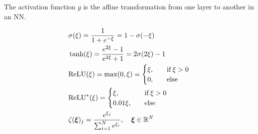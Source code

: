     




    
    The activation function $g$ is the affine transformation from one layer to another in an NN.   

    \begin{subequations}\label{eq:activation_functions}
        \begin{align}
            &\sigma(\xi) = \frac{1}{1+e^{-\xi}} = 1- \sigma(-\xi) \label{eq:sigmoid}\\
            &\tanh(\xi) = \frac{e^{2\xi}-1}{e^{2\xi}+1} = 2\sigma(2\xi) -1\label{eq:tanh} \\
            &\mathrm{ReLU}(\xi) = \max(0,\xi) = \begin{cases}
                \xi,\quad &\mathrm{if }\, \xi >0 \\
                0,\quad &\mathrm{else}
            \end{cases} \label{eq:relu}\\
            &\mathrm{ReLU}^*(\xi)  = \begin{cases}
                \xi,\quad &\mathrm{if }\, \xi >0 \\
                0.01\xi,\quad &\mathrm{else}
            \end{cases} \label{eq:leaky_relu} \\
            &\zeta(\svec{\xi})_j = \frac{e^{\xi_j}}{\sum\nolimits_{i=1}^{N}e^{\xi_i}}, \quad \svec{\xi} \in \RR[N]\label{eq:softmax}
        \end{align}
    \end{subequations}

